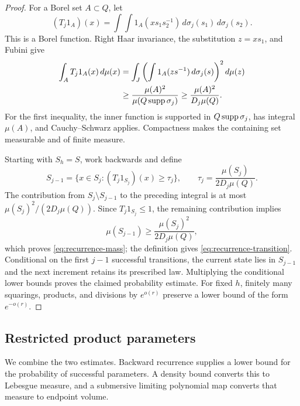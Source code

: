 \begin{proof}
For a Borel set $A\subset Q$, let
\[
 (T_j1_A)(x)
   =\int\!\int 1_A(x s_1s_2^{-1})
                      \,d\sigma_j(s_1)\,d\sigma_j(s_2).
\]
This is a Borel function.  Right Haar invariance, the substitution
$z=x s_1$, and Fubini give
\begin{align*}
 \int_A T_j1_A(x)\,d\mu(x)
 &=\int_J\left(\int 1_A(zs^{-1})\,d\sigma_j(s)\right)^2d\mu(z)\\
 &\ge\frac{\mu(A)^2}{\mu(Q\operatorname{supp}\sigma_j)}
 \ge\frac{\mu(A)^2}{D_j\mu(Q)}.
\end{align*}
For the first inequality, the inner function is supported in
$Q\operatorname{supp}\sigma_j$, has integral $\mu(A)$, and
Cauchy--Schwarz applies.  Compactness makes the containing set
measurable and of finite measure.

Starting with $S_h=S$, work backwards and define
\[
 S_{j-1}
   =\{x\in S_j:(T_j1_{S_j})(x)\ge\tau_j\},
 \qquad \tau_j=\frac{\mu(S_j)}{2D_j\mu(Q)}.
\]
The contribution from $S_j\setminus S_{j-1}$ to the preceding
integral is at most $\mu(S_j)^2/(2D_j\mu(Q))$.
Since $T_j1_{S_j}\le1$, the remaining contribution implies
\[
 \mu(S_{j-1})\ge\frac{\mu(S_j)^2}{2D_j\mu(Q)},
\]
which proves \eqref{eq:recurrence-mass}; the definition gives
\eqref{eq:recurrence-transition}.  Conditional on the first $j-1$
successful transitions, the current state lies in $S_{j-1}$ and
the next increment retains its prescribed law.  Multiplying the
conditional lower bounds proves the claimed probability estimate.
For fixed $h$, finitely many squarings, products, and divisions by
$e^{o(r)}$ preserve a lower bound of the form $e^{-o(r)}$.
\end{proof}

\subsection{Restricted product parameters}

We combine the two estimates.  Backward recurrence supplies a lower
bound for the probability of successful parameters.  A density bound
converts this to Lebesgue measure, and a submersive limiting polynomial
map converts that measure to endpoint volume.

